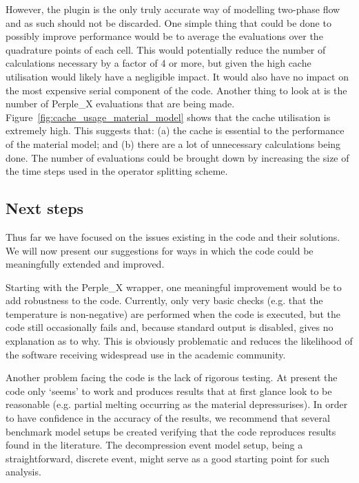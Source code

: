 However, the plugin is the only truly accurate way of modelling two-phase flow and as such should not be discarded.
One simple thing that could be done to possibly improve performance would be to average the evaluations over the quadrature points of each cell. 
This would potentially reduce the number of calculations necessary by a factor of \num{4} or more, but given the high cache utilisation would likely have a negligible impact.
It would also have no impact on the most expensive serial component of the code.
Another thing to look at is the number of Perple\_X evaluations that are being made.
Figure~\ref{fig:cache_usage_material_model} shows that the cache utilisation is extremely high.
This suggests that: 
(a) the cache is essential to the performance of the material model; 
and (b) there are a lot of unnecessary calculations being done.
The number of evaluations could be brought down by increasing the size of the time steps used in the operator splitting scheme.

\subsection{Next steps}

Thus far we have focused on the issues existing in the code and their solutions.
We will now present our suggestions for ways in which the code could be meaningfully extended and improved.

Starting with the Perple\_X wrapper, one meaningful improvement would be to add robustness to the code.
Currently, only very basic checks (e.g. that the temperature is non-negative) are performed when the code is executed, but the code still occasionally fails and, because standard output is disabled, gives no explanation as to why.
This is obviously problematic and reduces the likelihood of the software receiving widespread use in the academic community.

Another problem facing the code is the lack of rigorous testing.
At present the code only `seems' to work and produces results that at first glance look to be reasonable (e.g. partial melting occurring as the material depressurises).
In order to have confidence in the accuracy of the results, we recommend that several benchmark model setups be created verifying that the code reproduces results found in the literature.
The decompression event model setup, being a straightforward, discrete event, might serve as a good starting point for such analysis.

